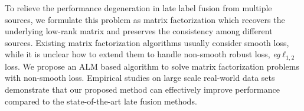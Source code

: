 \documentclass[10pt,twocolumn,letterpaper]{article}
\def\eg{{\emph{e.g.}}}
\def\eg{\emph{eg}}
\begin{document}
To relieve the performance degeneration in late label fusion from multiple sources, we formulate this problem as matrix factorization which recovers the underlying low-rank matrix and preserves the consistency among different sources.
Existing matrix factorization algorithms usually consider smooth loss, while it is unclear how to extend them to handle non-smooth robust loss, \eg $\ell_{1,2}$ loss.
We propose an ALM based algorithm to solve matrix factorization problems with non-smooth loss.
Empirical studies on large scale real-world data sets demonstrate that our proposed method can effectively improve performance compared to the state-of-the-art late fusion methods.

{\small


}
\end{document}
